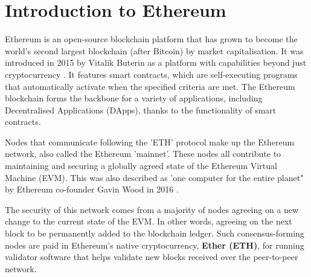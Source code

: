 
\section{Introduction to Ethereum}

Ethereum is an open-source blockchain platform that has grown to become the world's second largest blockchain (after Bitcoin) by market capitalisation. It was introduced in 2015 by Vitalik Buterin as a platform with capabilities beyond just cryptocurrency \cite{ButerinEthereum:Platform.}. It features smart contracts, which are self-executing programs that automatically activate when the specified criteria are met. The Ethereum blockchain forms the backbone for a variety of applications, including Decentralised Applications (DApps), thanks to the functionality of smart contracts.

Nodes that communicate following the 'ETH' protocol make up the Ethereum network, also called the Ethereum 'mainnet'. These nodes all contribute to maintaining and securing a globally agreed state of the Ethereum Virtual Machine (EVM). This was also described as 'one computer for the entire planet" by Ethereum co-founder Gavin Wood in 2016 \cite{Ethereum:Industries}. 

The security of this network comes from a majority of nodes agreeing on a new change to the current state of the EVM. In other words, agreeing on the next block to be permanently added to the blockchain ledger. Such consensus-forming nodes are paid in Ethereum's native cryptocurrency, \textbf{Ether (ETH)}, for running validator software that helps validate new blocks received over the peer-to-peer network.


